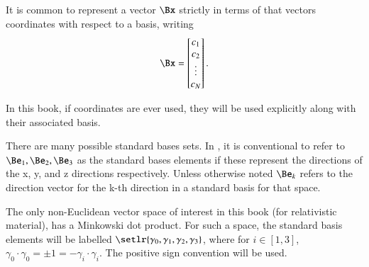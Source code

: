 It is common to represent a vector \( \Bx \) strictly in terms of that vectors coordinates with respect to a basis, writing
\begin{dmath}\label{eqn:multivector:180}
   \Bx =
\begin{bmatrix}
   c_1 \\
   c_2 \\
   \vdots \\
   c_N \\
\end{bmatrix}.
\end{dmath}

In this book, if coordinates are ever used, they will be used explicitly along with their associated basis.


There are many possible standard bases sets.  In , it is conventional to refer to \( \Be_1, \Be_2, \Be_3 \) as the standard bases elements if these represent the directions of the x, y, and z directions respectively.  Unless otherwise noted \( \Be_k \) refers to the direction vector for the k-th direction in a standard basis for that space.

The only non-Euclidean vector space of interest in this book (for relativistic material), has a Minkowski dot product.  For such a space, the standard basis elements will be labelled \( \setlr{ \gamma_0, \gamma_1, \gamma_2, \gamma_3 } \), where for \( i \in [1,3] \), \( \gamma_0 \cdot \gamma_0 = \pm 1 = -\gamma_i \cdot \gamma_i \).  The positive sign convention will be used.


